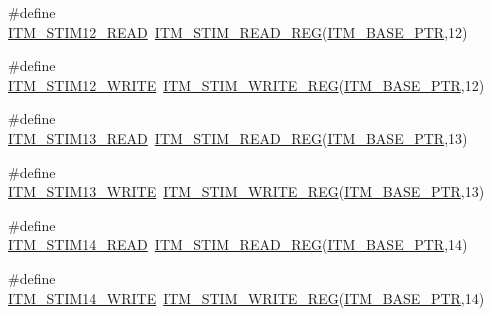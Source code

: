 \begin{DoxyCompactItemize}
\item 
\#define \hyperlink{group___i_t_m___register___accessor___macros_gabb2b8e4fa01909ba0dda5d7d62bb2b0c}{I\+T\+M\+\_\+\+S\+T\+I\+M12\+\_\+\+R\+E\+AD}~\hyperlink{group___i_t_m___register___accessor___macros_ga5009882336aadcd4f37b45cf3395c450}{I\+T\+M\+\_\+\+S\+T\+I\+M\+\_\+\+R\+E\+A\+D\+\_\+\+R\+EG}(\hyperlink{group___i_t_m___peripheral_gafaddee8fe8b6a898d4e5edc43ee0d703}{I\+T\+M\+\_\+\+B\+A\+S\+E\+\_\+\+P\+TR},12)
\item 
\#define \hyperlink{group___i_t_m___register___accessor___macros_ga61fb646c29b6f56928ca4e570b1e4167}{I\+T\+M\+\_\+\+S\+T\+I\+M12\+\_\+\+W\+R\+I\+TE}~\hyperlink{group___i_t_m___register___accessor___macros_ga049ca92a4e78e77c19af81e51aa73f1c}{I\+T\+M\+\_\+\+S\+T\+I\+M\+\_\+\+W\+R\+I\+T\+E\+\_\+\+R\+EG}(\hyperlink{group___i_t_m___peripheral_gafaddee8fe8b6a898d4e5edc43ee0d703}{I\+T\+M\+\_\+\+B\+A\+S\+E\+\_\+\+P\+TR},12)
\item 
\#define \hyperlink{group___i_t_m___register___accessor___macros_ga926c47eb7733a253885c7246858defa7}{I\+T\+M\+\_\+\+S\+T\+I\+M13\+\_\+\+R\+E\+AD}~\hyperlink{group___i_t_m___register___accessor___macros_ga5009882336aadcd4f37b45cf3395c450}{I\+T\+M\+\_\+\+S\+T\+I\+M\+\_\+\+R\+E\+A\+D\+\_\+\+R\+EG}(\hyperlink{group___i_t_m___peripheral_gafaddee8fe8b6a898d4e5edc43ee0d703}{I\+T\+M\+\_\+\+B\+A\+S\+E\+\_\+\+P\+TR},13)
\item 
\#define \hyperlink{group___i_t_m___register___accessor___macros_gab8eddf17288ccf56195272767250b472}{I\+T\+M\+\_\+\+S\+T\+I\+M13\+\_\+\+W\+R\+I\+TE}~\hyperlink{group___i_t_m___register___accessor___macros_ga049ca92a4e78e77c19af81e51aa73f1c}{I\+T\+M\+\_\+\+S\+T\+I\+M\+\_\+\+W\+R\+I\+T\+E\+\_\+\+R\+EG}(\hyperlink{group___i_t_m___peripheral_gafaddee8fe8b6a898d4e5edc43ee0d703}{I\+T\+M\+\_\+\+B\+A\+S\+E\+\_\+\+P\+TR},13)
\item 
\#define \hyperlink{group___i_t_m___register___accessor___macros_ga17048d30e461864d3d4ff5449fb8558f}{I\+T\+M\+\_\+\+S\+T\+I\+M14\+\_\+\+R\+E\+AD}~\hyperlink{group___i_t_m___register___accessor___macros_ga5009882336aadcd4f37b45cf3395c450}{I\+T\+M\+\_\+\+S\+T\+I\+M\+\_\+\+R\+E\+A\+D\+\_\+\+R\+EG}(\hyperlink{group___i_t_m___peripheral_gafaddee8fe8b6a898d4e5edc43ee0d703}{I\+T\+M\+\_\+\+B\+A\+S\+E\+\_\+\+P\+TR},14)
\item 
\#define \hyperlink{group___i_t_m___register___accessor___macros_ga74c1c1c1d5900b5c8553a289ddbab95b}{I\+T\+M\+\_\+\+S\+T\+I\+M14\+\_\+\+W\+R\+I\+TE}~\hyperlink{group___i_t_m___register___accessor___macros_ga049ca92a4e78e77c19af81e51aa73f1c}{I\+T\+M\+\_\+\+S\+T\+I\+M\+\_\+\+W\+R\+I\+T\+E\+\_\+\+R\+EG}(\hyperlink{group___i_t_m___peripheral_gafaddee8fe8b6a898d4e5edc43ee0d703}{I\+T\+M\+\_\+\+B\+A\+S\+E\+\_\+\+P\+TR},14)

\end{DoxyCompactItemize}

